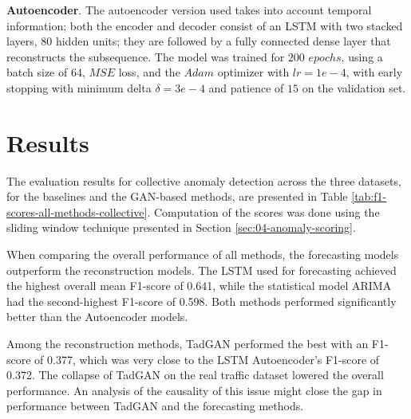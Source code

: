 \textbf{Autoencoder}. The autoencoder version used takes into account temporal information; both the encoder and decoder consist of an LSTM with two stacked layers, $80$ hidden units; they are followed by a fully connected dense layer that reconstructs the subsequence. The model was trained for $200$ $epochs$, using a batch size of $64$, $MSE$ loss, and the $Adam$ optimizer with $lr = 1e-4$, with early stopping with minimum delta $\delta = 3e-4$ and patience of $15$ on the validation set.


\section*{Results}
\label{sec:05-results}
The evaluation results for collective anomaly detection across the three datasets, for the baselines and the GAN-based methods, are presented in Table \ref{tab:f1-scores-all-methods-collective}. Computation of the scores was done using the sliding window technique presented in Section \ref{sec:04-anomaly-scoring}. 

When comparing the overall performance of all methods, the forecasting models outperform the reconstruction models. The LSTM used for forecasting achieved the highest overall mean F1-score of 0.641, while the statistical model ARIMA had the second-highest F1-score of 0.598. Both methods performed significantly better than the Autoencoder models.

Among the reconstruction methods, TadGAN performed the best with an F1-score of 0.377, which was very close to the LSTM Autoencoder's F1-score of 0.372. The collapse of TadGAN on the real traffic dataset lowered the overall performance. An analysis of the causality of this issue might close the gap in performance between TadGAN and the forecasting methods.

